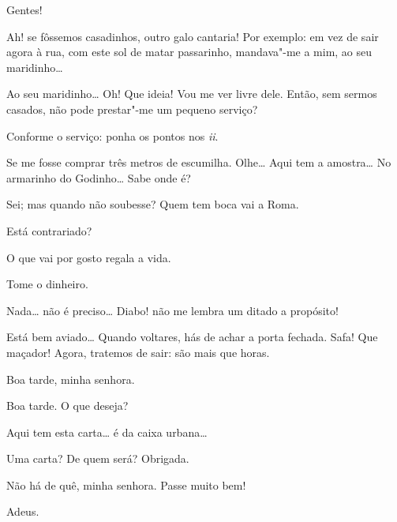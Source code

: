 \begin{linenumbers}
  Gentes!

  Ah! se fôssemos casadinhos, outro galo cantaria! Por exemplo: em
vez de sair agora à rua, com este sol de matar passarinho, mandava"-me a mim, ao
seu maridinho\ldots{}

  Ao seu maridinho\ldots{} 
Oh! Que ideia! Vou me ver livre dele.  Então, sem sermos casados,
não pode prestar"-me um pequeno serviço?

  Conforme o serviço: ponha os pontos nos \textit{ii}.

  Se me fosse comprar três metros de escumilha. Olhe\ldots{} Aqui tem
a amostra\ldots{} No armarinho do Godinho\ldots{} Sabe onde é?

  Sei; mas quando não soubesse? Quem tem boca vai a Roma.

  Está contrariado?

  O que vai por gosto regala a vida.

  Tome o dinheiro.

  Nada\ldots{} não é preciso\ldots{} 
Diabo! não me lembra um ditado a propósito! 


\stagedir{\textsc{[Inês]}}

  Está bem aviado\ldots{} Quando voltares, hás de achar a porta
fechada. 
Safa! Que maçador! Agora, tratemos de sair: são mais que horas. 



  Boa tarde, minha senhora.

  Boa tarde. O que deseja?

  Aqui tem esta carta\ldots{} é da caixa urbana\ldots{}

  Uma carta?  De quem será?
 Obrigada.

  Não há de quê, minha senhora. Passe muito bem!

 Adeus. 


\stagedir{\textsc{[Inês]}}


\end{linenumbers}
